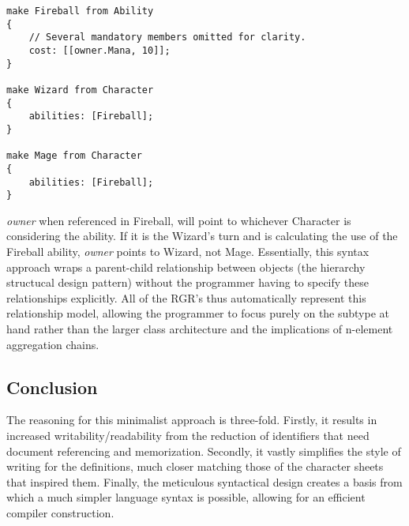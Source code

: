 \begin{lstlisting}
make Fireball from Ability
{
	// Several mandatory members omitted for clarity.
	cost: [[owner.Mana, 10]];
}

make Wizard from Character
{
	abilities: [Fireball];
}

make Mage from Character
{
	abilities: [Fireball];
}
\end{lstlisting}

\emph{owner} when referenced in Fireball, will point to whichever Character is considering the ability. If it is the Wizard's turn and is calculating the use of the Fireball ability, \emph{owner} points to Wizard, not Mage. Essentially, this syntax approach wraps a parent-child relationship between objects (the hierarchy structucal design pattern) without the programmer having to specify these relationships explicitly. All of the RGR's thus automatically represent this relationship model, allowing the programmer to focus purely on the subtype at hand rather than the larger class architecture and the implications of n-element aggregation chains.

\subsection{Conclusion}

The reasoning for this minimalist approach is three-fold. Firstly, it results in increased writability/readability from the reduction of identifiers that need document referencing and memorization. Secondly, it vastly simplifies the style of writing for the definitions, much closer matching those of the character sheets that inspired them. Finally, the meticulous syntactical design creates a basis from which a much simpler language syntax is possible, allowing for an efficient compiler construction.